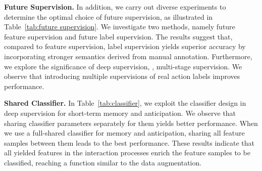 \textbf{Future Supervision.}
In addition, we carry out diverse experiments to determine the optimal choice of future supervision, as illustrated in Table~\ref{tab:future supervision}. We investigate two methods, namely future feature supervision and future label supervision. The results suggest that, compared to feature supervision, label supervision yields superior accuracy by incorporating stronger semantics derived from manual annotation.
Furthermore, we explore the significance of deep supervision, \ie, multi-stage supervision. We observe that introducing multiple supervisions of real action labels improves performance.





\textbf{Shared Classifier.}
In Table~\ref{tab:classifier}, we exploit the classifier design in deep supervision for short-term memory and anticipation. 
We observe that sharing classifier parameters separately for them yields better performance. When we use a full-shared classifier for memory and anticipation, sharing all feature samples between them leads to the best performance. These results indicate that all yielded features in the interaction processes enrich the feature samples to be classified, reaching a function similar to the data augmentation.

\begin{table}
    \centering
    \small
    \caption{\textbf{Action anticipation result} on THUMOS'14 and TVSeries, mAP is reported for THUMOS'14 and mcAP for TVSeries.}
    \vspace{-3mm}
    \label{tab:anticipation}
\end{table}

